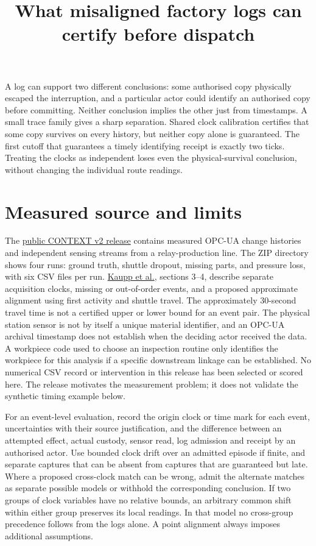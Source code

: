 \documentclass[11pt]{article}
\title{What misaligned factory logs can certify before dispatch}
\date{}
\begin{document}
\maketitle

A log can support two different conclusions: some authorised copy
physically escaped the interruption, and a particular actor could
identify an authorised copy before committing. Neither conclusion
implies the other just from timestamps. A small trace family gives a
sharp separation. Shared clock calibration certifies that some copy
survives on every history, but neither copy alone is guaranteed.
The first cutoff that guarantees a timely identifying receipt is
exactly two ticks. Treating the clocks as independent loses even
the physical-survival conclusion, without changing the individual
route readings.

\section{Measured source and limits}
The \href{https://zenodo.org/records/4034867}{public CONTEXT v2 release}
contains measured OPC-UA change histories and independent sensing
streams from a relay-production line. The ZIP directory shows four
runs: ground truth, shuttle dropout, missing parts, and pressure
loss, with six CSV files per run. \href{https://www.sciencedirect.com/science/article/pii/S1877050921003148/pdf}{Kaupp
et al.}, sections 3--4, describe separate acquisition clocks,
missing or out-of-order events, and a proposed approximate alignment
using first activity and shuttle travel. The approximately 30-second
travel time is not a certified upper or lower bound for an event
pair. The physical station sensor is not by itself a unique material
identifier, and an OPC-UA archival timestamp does not establish
when the deciding actor received the data. A workpiece code used
to choose an inspection routine only identifies the workpiece for
this analysis if a specific downstream linkage can be established.
No numerical CSV record or intervention in this release has been
selected or scored here. The release motivates the measurement
problem; it does not validate the synthetic timing example below.

For an event-level evaluation, record the origin clock or time
mark for each event, uncertainties with their source justification,
and the difference between an attempted effect, actual custody,
sensor read, log admission and receipt by an authorised actor.
Use bounded clock drift over an admitted episode if finite, and
separate captures that can be absent from captures that are
guaranteed but late. Where a proposed cross-clock match can be
wrong, admit the alternate matches as separate possible models
or withhold the corresponding conclusion. If two groups of clock
variables have no relative bounds, an arbitrary common shift within
either group preserves its local readings. In that model no
cross-group precedence follows from the logs alone. A point
alignment always imposes additional assumptions.
\end{document}
